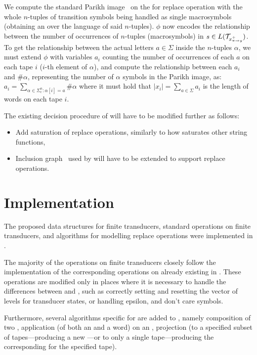 We compute the standard Parikh image~\cite{DBLP:conf/icalp/SeidlSMH04} on the \nft for replace operation with the whole $n$-tuples of transition symbols being handled as single macrosymbols (obtaining an \nfa over the language of said $n$-tuples).
$\phi$ now encodes the relationship between the number of occurrences of $n$-tuples (macrosymbols) in $s \in L(\mathcal{T}_{x^{+}_{\pi \rightarrow y}})$.
To get the relationship between the actual letters $a \in \Sigma$ inside the $n$-tuples $\alpha$, we must extend $\phi$ with variables $a_i$ counting the number of occurrences of each $a$ on each tape $i$ ($i$-th element of $\alpha$), and compute the relationship between each $a_i$ and $\#\alpha$, representing the number of $\alpha$ symbols in the Parikh image, as: $a_i = \sum_{\alpha \in \Sigma^n_{\epsilon}: \alpha[i] = a} \#\alpha$ where it must hold that $|x_i| = \sum_{a \in \Sigma} a_i $ is the length of words on each tape $i$.

The existing decision procedure of \noodler will have to be modified further as follows:
\begin{itemize}
  \item Add saturation of replace operations, similarly to how \noodler saturates other string functions,
  \item Inclusion graph~\cite{fm23_equations_synergy_regular_constraints_DBLP:conf/fm/BlahoudekCCHHLS23} used by \noodler will have to be extended to support replace operations.
\end{itemize}

\chapter{Implementation}

The proposed data structures for finite transducers, standard operations on finite transducers, and algorithms for modelling replace operations were implemented in \mata.

The majority of the operations on finite transducers closely follow the implementation of the corresponding operations on \nfas already existing in \mata.
These operations are modified only in places where it is necessary to handle the differences between \nfas and \nfts, such as correctly setting and resetting the vector of levels for transducer states, or handling epsilon, \nop and don't care symbols.

Furthermore, several algorithms specific for \nfts are added to \mata, namely composition of two \nfts, application (of both an \nfa and a word) on an \nft, projection (to a specified subset of \nft tapes---producing a new \nft---or to only a single tape---producing the corresponding \nfa for the specified tape).

